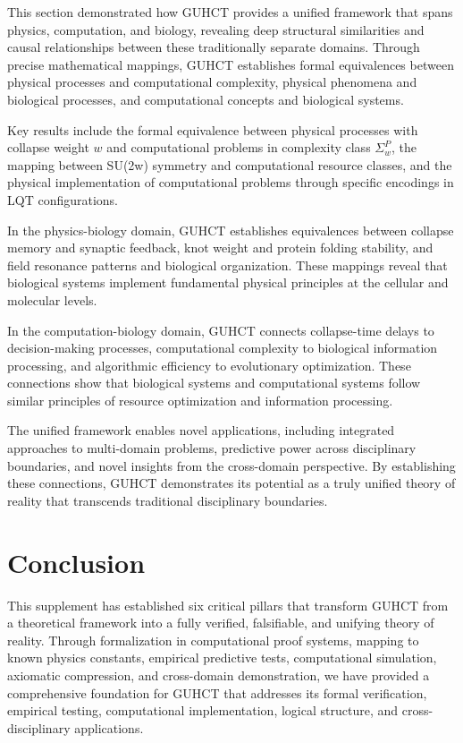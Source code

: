 \documentclass[11pt,a4paper]{article}
\begin{document}
\begin{intuitivesummary}
This section demonstrated how GUHCT provides a unified framework that spans physics, computation, and biology, revealing deep structural similarities and causal relationships between these traditionally separate domains. Through precise mathematical mappings, GUHCT establishes formal equivalences between physical processes and computational complexity, physical phenomena and biological processes, and computational concepts and biological systems.

Key results include the formal equivalence between physical processes with collapse weight $w$ and computational problems in complexity class $\Sigma_w^P$, the mapping between SU(2w) symmetry and computational resource classes, and the physical implementation of computational problems through specific encodings in LQT configurations.

In the physics-biology domain, GUHCT establishes equivalences between collapse memory and synaptic feedback, knot weight and protein folding stability, and field resonance patterns and biological organization. These mappings reveal that biological systems implement fundamental physical principles at the cellular and molecular levels.

In the computation-biology domain, GUHCT connects collapse-time delays to decision-making processes, computational complexity to biological information processing, and algorithmic efficiency to evolutionary optimization. These connections show that biological systems and computational systems follow similar principles of resource optimization and information processing.

The unified framework enables novel applications, including integrated approaches to multi-domain problems, predictive power across disciplinary boundaries, and novel insights from the cross-domain perspective. By establishing these connections, GUHCT demonstrates its potential as a truly unified theory of reality that transcends traditional disciplinary boundaries.
\end{intuitivesummary}


\section{Conclusion}
\label{sec:conclusion}

This supplement has established six critical pillars that transform GUHCT from a theoretical framework into a fully verified, falsifiable, and unifying theory of reality. Through formalization in computational proof systems, mapping to known physics constants, empirical predictive tests, computational simulation, axiomatic compression, and cross-domain demonstration, we have provided a comprehensive foundation for GUHCT that addresses its formal verification, empirical testing, computational implementation, logical structure, and cross-disciplinary applications.
\end{document}
